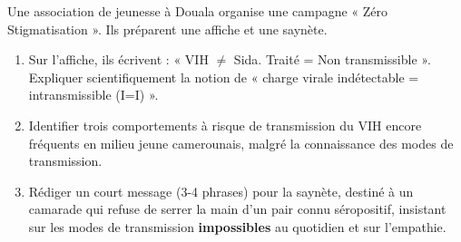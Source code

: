 \documentclass[11pt]{article}
\begin{document}
\begin{exercice}
Une association de jeunesse à Douala organise une campagne « Zéro Stigmatisation ». Ils préparent une affiche et une saynète.
\begin{enumerate}
    \item Sur l'affiche, ils écrivent : « VIH $\neq$ Sida. Traité = Non transmissible ». Expliquer scientifiquement la notion de « charge virale indétectable = intransmissible (I=I) ».
    \item Identifier trois comportements à risque de transmission du VIH encore fréquents en milieu jeune camerounais, malgré la connaissance des modes de transmission.
    \item Rédiger un court message (3-4 phrases) pour la saynète, destiné à un camarade qui refuse de serrer la main d'un pair connu séropositif, insistant sur les modes de transmission \textbf{impossibles} au quotidien et sur l'empathie.
\end{enumerate}
\end{exercice}
\end{document}
